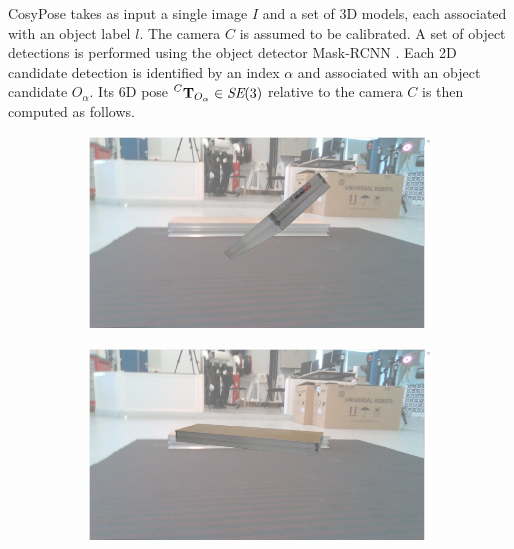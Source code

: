 CosyPose takes as input a single image $I$ and a set of 3D models, each associated with an object label $l$. The camera $C$ is assumed to be calibrated. 
A set of object detections is performed using the object detector Mask-RCNN \cite{he2018mask}. Each 2D candidate detection is identified 
by an index $\alpha$ and associated with an object candidate $O_{\alpha}$. Its 6D pose $\prescript{C}{}{{\bf T}}_{O_{\alpha}} \in \textit{SE} (3)$ relative to the camera $C$ 
is then computed as follows.

\begin{figure}[]
    \begin{subfigure}{.5\textwidth} %
        \centering
        \includegraphics[width=.9\linewidth]{figures/cosyslam/convergence_1.png}  %
    \end{subfigure}
    \begin{subfigure}{.5\textwidth}
        \centering
        \includegraphics[width=.9\linewidth]{figures/cosyslam/convergence_2.png}  
    \end{subfigure}


\end{figure}
